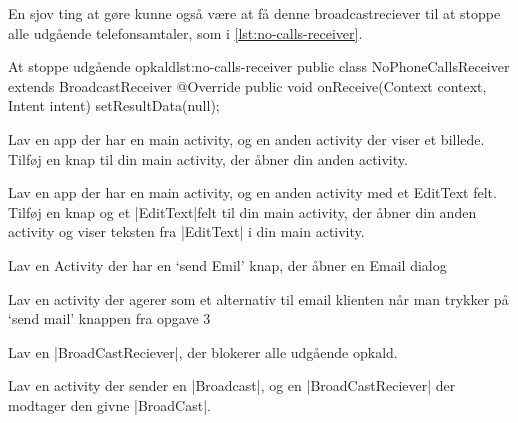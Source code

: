 En sjov ting at gøre kunne også være at få denne broadcastreciever til at stoppe alle udgående telefonsamtaler, som i \autoref{lst:no-calls-receiver}.

\begin{example}\noindent
	\begin{JavaCode}{At stoppe udgående opkald}{lst:no-calls-receiver}
		public class NoPhoneCallsReceiver extends BroadcastReceiver {
			@Override
			public void onReceive(Context context, Intent intent) {
				setResultData(null);
			}
		}
	\end{JavaCode}
\end{example}

\begin{exercise}
	Lav en app der har en main activity, og en anden activity der viser et billede. Tilføj en knap til din main activity, der åbner din anden activity.
\end{exercise}

\begin{exercise}
	Lav en app der har en main activity, og en anden activity med et EditText felt. Tilføj en knap og et \JavaInline|EditText|felt til din main activity, der åbner din anden activity og viser teksten fra \JavaInline|EditText| i din main activity.
\end{exercise}

\begin{exercise}
	Lav en Activity der har en ‘send Emil’ knap, der åbner en Email dialog
\end{exercise}

\begin{exercise}
	Lav en activity der agerer som et alternativ til email klienten når man trykker på ‘send mail’ knappen fra opgave 3
\end{exercise}

\begin{exercise}
	Lav en \JavaInline|BroadCastReciever|, der blokerer alle udgående opkald.
\end{exercise}

\begin{exercise}
	Lav en activity der sender en \JavaInline|Broadcast|, og en \JavaInline|BroadCastReciever| der modtager den givne \JavaInline|BroadCast|.
\end{exercise}

